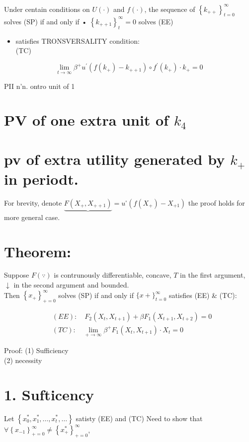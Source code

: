\documentclass[10pt]{article}
\begin{document}
Under centain conditions on $U(\cdot)$ and $f(\cdot)$, the sequence of $\left\{k_{++}\right\}_{t=0}^{\infty}$ solves (SP) if and only if • $\left\{k_{++1}\right\}_{t}^{\infty}=0$ solves (EE)

\begin{itemize}
  \item satisfies TRONSVERSALITY condition:\\
(TC)
\end{itemize}

$$
\lim _{t \rightarrow \infty} \beta^{+} u^{\prime}\left(f\left(k_{+}\right)-k_{++1}\right) \circ f^{\prime}\left(k_{+}\right) \cdot k_{+}=0
$$

PII n'n. ontro unit of 1

\section*{PV of one extra unit of $k_{4}$}
\section*{pv of extra utility generated by $k_{+}$ \\
 in periodt.}
For brevity, denote $\underbrace{F\left(X_{+}, X_{++1}\right)}=u^{\square}\left(f\left(X_{+}\right)-X_{+1}\right)$ the proof holds for more general case.

\section*{Theorem:}
Suppose $F(\because)$ is contrunously differentiable, concave, $T$ in the first argument, $\downarrow$ in the second argument and bounded.\\
Then $\left\{x_{+}\right\}_{+=0}^{\infty}$ solves (SP) if and only if $\{x+\}_{t=0}^{\infty}$ satisfies (EE) \& (TC):

$$
\begin{aligned}
& (E E): \quad F_{2}\left(X_{t}, X_{t+1}\right)+\beta F_{1}\left(X_{t+1}, X_{t+2}\right)=0 \\
& (T C): \quad \lim _{+\rightarrow \infty} \beta^{+} F_{1}\left(X_{t}, X_{t+1}\right) \cdot X_{t}=0
\end{aligned}
$$

Proof: (1) Sufficiency\\
(2) necessity

\section*{1. Sufticency}
Let $\left\{x_{0}^{*}, x_{1}^{*}, \ldots, x_{t}^{*}, \ldots\right\}$ satisty (EE) and (TC) Need to show that $\forall\left\{x_{-1}\right\}_{+=0}^{\infty} \neq\left\{x_{+}^{*}\right\}_{+=0}^{\infty}$,
\end{document}
